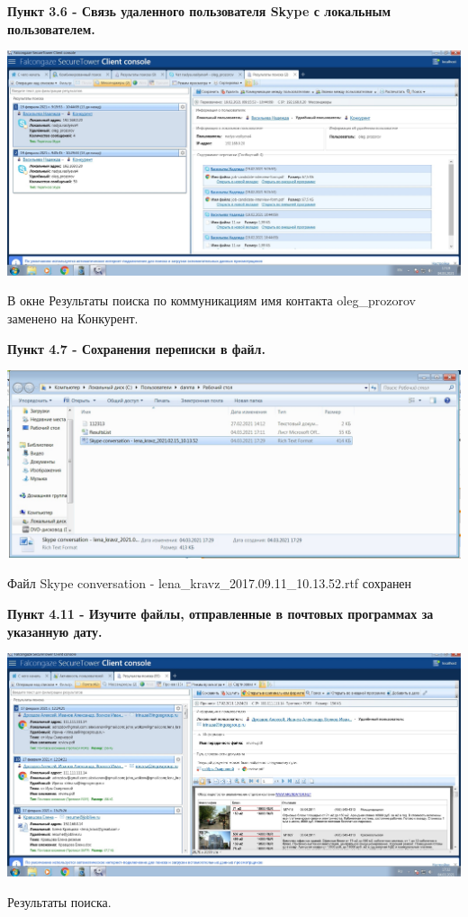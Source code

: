 \documentclass[a4paper,14pt]{extarticle}
\begin{document}
    \newpage
    \textbf{Пункт 3.6 - Связь удаленного пользователя Skype с локальным пользователем.}
    \begin{center}
        \includegraphics[scale=0.25]{pics/3.6.jpg}

        В окне Результаты поиска по коммуникациям имя контакта
        oleg\_prozorov заменено на Конкурент.
    \end{center}

    \textbf{Пункт 4.7 - Сохранения переписки в файл.}
    \begin{center}
        \includegraphics[scale=0.3]{pics/4.7.jpg}

        Файл Skype conversation - lena\_kravz\_2017.09.11\_10.13.52.rtf сохранен
    \end{center}

    \newpage
    \textbf{Пункт 4.11 - Изучите файлы, отправленные в почтовых программах за указанную дату.}
    \begin{center}
        \includegraphics[scale=0.25]{pics/4.11.jpg}

        Результаты поиска.
    \end{center}
\end{document}
